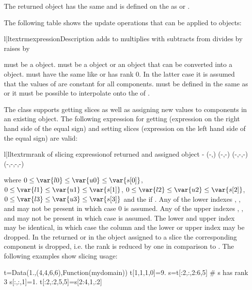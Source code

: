 The returned \Data object has the same \Shape and is defined on
the \DataSamplePoints as  or .

The following table shows the update operations that can be applied to
\Data objects:
\begin{tableii}{l|l}{textrm}{expression}{Description}
 {adds  to  \index{+}}
 {multiplies  with  \index{*}}
 {subtracts  from \index{-}}
 {divides  by  \index{/}}
 {raises  by  \index{**}}
\end{tableii}
 must be a \Data object.  must be a
\Data object or an object that can be converted into a
\Data object.  must have the same \Shape like
 or has rank 0.  In the latter case it is
assumed that the values of  are constant for all
components.  must be defined in the same \FunctionSpace as
 or it must be possible to interpolate  onto the
\FunctionSpace of .

The \Data class supports getting slices as well as assigning new values to components in an existing
\Data object. 
The following expression for getting (expression on the right hand side of the
equal sign) and setting slices (expression on the left hand side of the
equal sign) are valid:
\begin{tableiii}{l|ll}{textrm}{rank of }{slicing expression}{\Shape of returned and assigned object}
                      {-}
                   {(-,)}
             {(-,-)}
      {(-,-,-)}
 {(-,-,-,-)}
\end{tableiii}
where 
$0 \le \var{l0} \le \var{u0} \le \var{s[0]}$,
$0 \le \var{l1} \le \var{u1} \le \var{s[1]}$, 
$0 \le \var{l2} \le \var{u2} \le \var{s[2]}$, 
$0 \le \var{l3} \le \var{u3} \le \var{s[3]}$ and  the \Shape if . 
Any of the lower indexes , ,  and  may not be present in which case 
$0$ is assumed. 
Any of the upper indexes , ,  and  may not be present in which case 
 is assumed. The lower and upper index may be identical, in which case the column and the lower or upper
index may be dropped. In the returned or in the object assigned to a slice the corresponding component is dropped,
i.e. the rank is reduced by one in comparison to .
The following examples show slicing usage:  
\begin{python}
t=Data(1.,(4,4,6,6),Function(mydomain))
t[1,1,1,0]=9.
s=t[:2,:,2:6,5] # s has rank 3
s[:,:,1]=1.
t[:2,:2,5,5]=s[2:4,1,:2]
\end{python}

